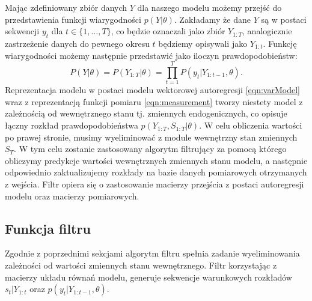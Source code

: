 Mając zdefiniowany zbiór danych $Y$ dla naszego modelu możemy przejść  do przedstawienia funkcji wiarygodności $p(Y|\theta)$. Zakładamy że dane $Y$ są w postaci sekwencji $y_t$ dla $t \in \{1,\dots, T\}$, co będzie oznaczali jako zbiór $Y_{1:T}$, analogicznie zastrzeżenie danych do pewnego okresu $t$ będziemy opisywali jako $Y_{1:t}$. Funkcję wiarygodności możemy następnie przedstawić jako iloczyn prawdopodobieństw:
\begin{equation}
    P(Y | \theta) = P(Y_{1:T} | \theta) = \prod_{t=1}^T P(y_t|Y_{1:t-1},\theta).
\end{equation}
Reprezentacja modelu w postaci modelu wektorowej autoregresji \eqref{eqn:varModel} wraz z reprezentacją funkcji pomiaru \eqref{eqn:measurement} tworzy niestety model z zależnością od wewnętrznego stanu tj. zmiennych endogenicznych, co opisuje łączny rozkład prawdopodobieństwa $p(Y_{1:T}, S_{1:T}|\theta)$. W celu obliczenia wartości po prawej stronie, musimy wyeliminować z module wewnętrzny stan zmiennych $S_T$. W tym celu zostanie zastosowany algorytm filtrujący za pomocą którego obliczymy predykcje wartości wewnętrznych zmiennych stanu modelu, a następnie odpowiednio zaktualizujemy rozkłady na bazie danych pomiarowych otrzymanych z wejścia. Filtr opiera się o zastosowanie macierzy przejścia z postaci autoregresji modelu oraz macierzy pomiarowych.

\subsection{Funkcja filtru}
\label{sec:filter_function}

Zgodnie z poprzednimi sekcjami algorytm filtru spełnia zadanie wyeliminowania zależności od wartości zmiennych stanu wewnętrznego. Filtr korzystając z macierzy układu równań modelu, generuje sekwencje warunkowych rozkładów $s_t|Y_{1:t}$ oraz $p(y_t|Y_{1:t-1}, \theta)$.

